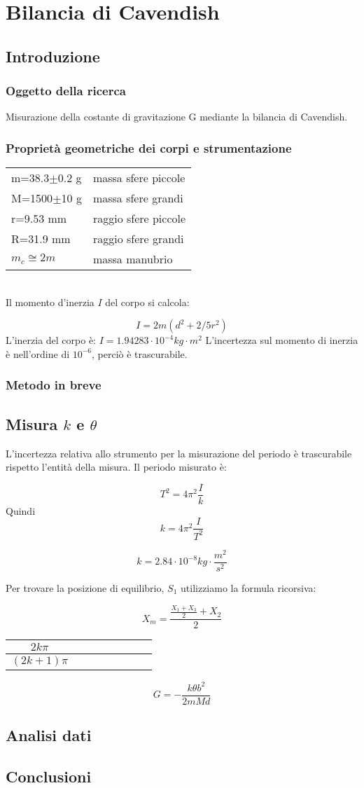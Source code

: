 \chapter{Bilancia di Cavendish}
\section{Introduzione}
\subsection{Oggetto della ricerca}
Misurazione della costante di gravitazione G mediante la bilancia di Cavendish.
\subsection{Proprietà geometriche dei corpi e strumentazione}

\begin{tabular}{ll}
m=38.3$\pm$0.2 g & massa sfere piccole\\
M=1500$\pm$10 g	 & massa sfere grandi\\
r=9.53 mm & raggio sfere piccole\\
R=31.9 mm	 & raggio sfere grandi\\
$m_c\cong 2m$ & massa manubrio\\
\end{tabular}
\\
Il momento d'inerzia $I$ del corpo si calcola:

$$ I=2m(d^2+2/5r^2)$$
L'inerzia del corpo è:
$I = 1.94283 \cdot 10^{-4} kg\cdot m^2$
L'incertezza sul momento di inerzia è nell'ordine di $10^{-6}$, perciò è trascurabile. 
\subsection{Metodo in breve}



\section{Misura $k$ e $\theta$}
L'incertezza relativa allo strumento per la misurazione del periodo è trascurabile rispetto l'entità della misura. 
Il periodo misurato è:

$$T^2 = 4 \pi^2 \frac{I}{k}$$
Quindi
$$k = 4 \pi^2 \frac{I}{T^2}$$

$$k = 2.84 \cdot 10^{-8} kg \cdot \frac{m^2}{s^2}$$

Per trovare la posizione di equilibrio, $S_1$ utilizziamo la formula ricorsiva:

$$X_m = \frac{\frac{X_1+X_3}{2} +X_2}{2}$$ 

\begin{tabular}{c|*{7}{c}}
$2k\pi$ & \\
\midrule
$(2k+1)\pi$ & \\
\end{tabular}

$$G = -\frac{k \theta b^2}{2mMd} $$

\section{Analisi dati} 

\section{Conclusioni}

